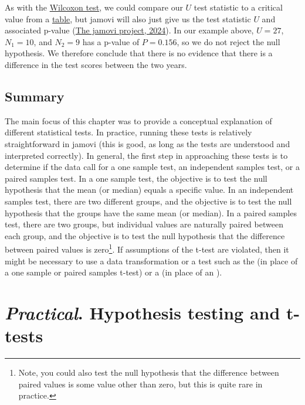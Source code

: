 \documentclass[
  openany]{krantz}
\begin{document}
\newpage

As with the \protect\hyperlink{wilcoxon-test}{Wilcoxon test}, we could compare our \(U\) test statistic to a critical value from a \protect\hyperlink{mann-whitney-u-critical-values}{table}, but jamovi will also just give us the test statistic \(U\) and associated p-value (\protect\hyperlink{ref-Jamovi2022}{The jamovi project, 2024}).
In our example above, \(U = 27\), \(N_{1} = 10\), and \(N_{2} = 9\) has a p-value of \(P = 0.156\), so we do not reject the null hypothesis.
We therefore conclude that there is no evidence that there is a difference in the  test scores between the two years.

\hypertarget{summary-3}{%
\section{Summary}\label{summary-3}}

The main focus of this chapter was to provide a conceptual explanation of different statistical tests.
In practice, running these tests is relatively straightforward in jamovi (this is good, as long as the tests are understood and interpreted correctly).
In general, the first step in approaching these tests is to determine if the data call for a one sample test, an independent samples test, or a paired samples test.
In a one sample test, the objective is to test the null hypothesis that the mean (or median) equals a specific value.
In an independent samples test, there are two different groups, and the objective is to test the null hypothesis that the groups have the same mean (or median).
In a paired samples test, there are two groups, but individual values are naturally paired between each group, and the objective is to test the null hypothesis that the difference between paired values is zero\footnote{Note, you could also test the null hypothesis that the difference between paired values is some value other than zero, but this is quite rare in practice.}.
If assumptions of the t-test are violated, then it might be necessary to use a data transformation or a  test such as the  (in place of a one sample or paired samples t-test) or a  (in place of an ).

\hypertarget{Chapter_23}{%
\chapter{\texorpdfstring{\emph{Practical}. Hypothesis testing and t-tests}{Practical. Hypothesis testing and t-tests}}\label{Chapter_23}}
\end{document}
